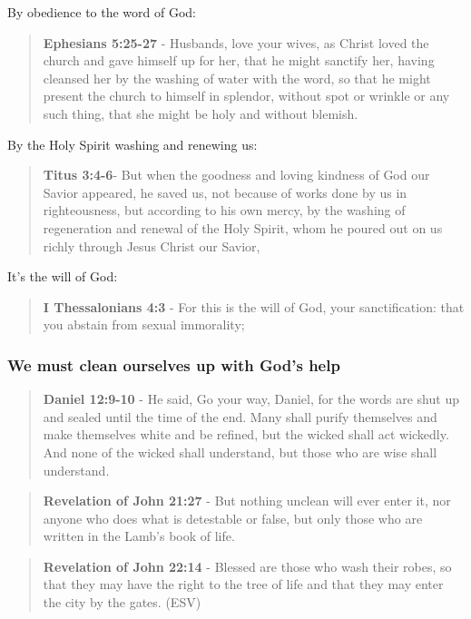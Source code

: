 \documentclass[11pt]{article}
\begin{document}
By obedience to the word of God:

\begin{quote}
\textbf{Ephesians 5:25-27} - Husbands, love your wives, as Christ loved the church and gave himself up for her, that he might sanctify her, having cleansed her by the washing of water with the word, so that he might present the church to himself in splendor, without spot or wrinkle or any such thing, that she might be holy and without blemish.
\end{quote}

By the Holy Spirit washing and renewing us:

\begin{quote}
\textbf{Titus 3:4-6}- But when the goodness and loving kindness of God our Savior appeared, he saved us, not because of works done by us in righteousness, but according to his own mercy, by the washing of regeneration and renewal of the Holy Spirit, whom he poured out on us richly through Jesus Christ our Savior,
\end{quote}

It's the will of God:

\begin{quote}
\textbf{I Thessalonians 4:3} - For this is the will of God, your sanctification: that you abstain from sexual immorality;
\end{quote}

\subsubsection{We \textbf{must} clean ourselves up with God's help}
\label{sec:org6378642}
\begin{quote}
\textbf{Daniel 12:9-10} - He said, Go your way, Daniel, for the words are shut up and sealed until the time of the end.  Many shall purify themselves and make themselves white and be refined, but the wicked shall act wickedly. And none of the wicked shall understand, but those who are wise shall understand.
\end{quote}

\begin{quote}
\textbf{Revelation of John 21:27} - But nothing unclean will ever enter it, nor anyone who does what is detestable or false, but only those who are written in the Lamb's book of life.
\end{quote}

\begin{quote}
\textbf{Revelation of John 22:14} - Blessed are those who wash their robes, so that they may have the right to the tree of life and that they may enter the city by the gates. (ESV)
\end{quote}
\end{document}
